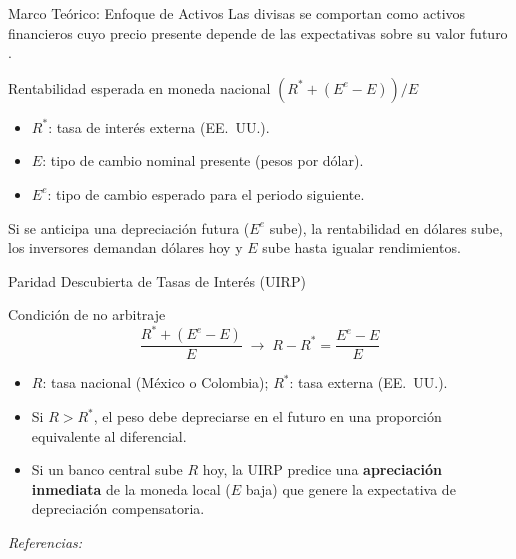 \documentclass[10pt,professionalfonts,aspectratio=169]{beamer}
\begin{document}
\begin{frame}{Marco Teórico: Enfoque de Activos}
    Las divisas se comportan como activos financieros cuyo precio presente depende de las expectativas sobre su valor futuro \parencite{krugman2012}.

    \begin{block}{Rentabilidad esperada en moneda nacional}
        \centering
        $(R^* + (E^e - E))/E$
    \end{block}

    \begin{itemize}
        \item $R^*$: tasa de interés externa (EE.~UU.).
        \item $E$: tipo de cambio nominal presente (pesos por dólar).
        \item $E^e$: tipo de cambio esperado para el periodo siguiente.
    \end{itemize}

    \vspace{0.2cm}
    Si se anticipa una depreciación futura ($E^e$ sube), la rentabilidad en dólares sube, los inversores demandan dólares hoy y $E$ sube hasta igualar rendimientos.
\end{frame}

\begin{frame}{Paridad Descubierta de Tasas de Interés (UIRP)}
    \begin{block}{Condición de no arbitraje}
        \[
            \frac{R^* + (E^e - E)}{E} \;\longrightarrow\; R - R^* = \frac{E^e - E}{E}
        \]
    \end{block}

    \begin{itemize}
        \item $R$: tasa nacional (México o Colombia); \quad $R^*$: tasa externa (EE.~UU.).
        \item Si $R > R^*$, el peso debe depreciarse en el futuro en una proporción equivalente al diferencial.
        \item Si un banco central sube $R$ hoy, la UIRP predice una \textbf{apreciación inmediata} de la moneda local ($E$ baja) que genere la expectativa de depreciación compensatoria.
    \end{itemize}

    \vspace{0.1cm}
    \footnotesize\textit{Referencias:} \parencite{krugman2012,isard2006}
\end{frame}
\end{document}
